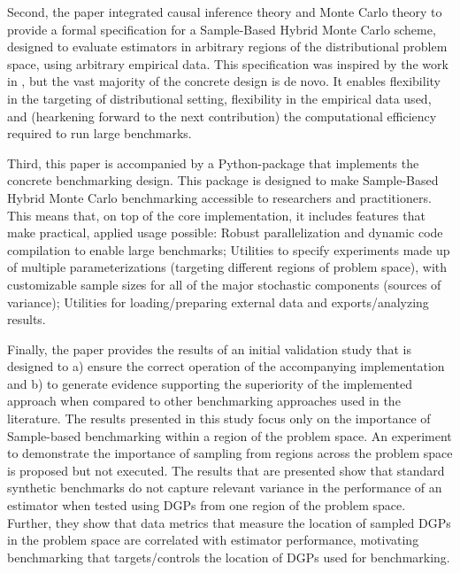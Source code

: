 \documentclass[../main.tex]{subfiles}
\begin{document}
\vspace{\baselineskip}

Second, the paper integrated causal inference theory and Monte Carlo theory to provide a formal specification for a Sample-Based Hybrid Monte Carlo scheme, designed to evaluate estimators in arbitrary regions of the distributional problem space, using arbitrary empirical data. This specification was inspired by the work in \textcite{Dorie2019Automated1}, but the vast majority of the concrete design is de novo. It enables flexibility in the targeting of distributional setting, flexibility in the empirical data used, and (hearkening forward to the next contribution) the computational efficiency required to run large benchmarks.

\vspace{\baselineskip}

Third, this paper is accompanied by a Python-package that implements the concrete benchmarking design. This package is designed to make Sample-Based Hybrid Monte Carlo benchmarking accessible to researchers and practitioners. This means that, on top of the core implementation, it includes features that make practical, applied usage possible: Robust parallelization and dynamic code compilation to enable large benchmarks; Utilities to specify experiments made up of multiple parameterizations (targeting different regions of problem space), with customizable sample sizes for all of the major stochastic components (sources of variance); Utilities for loading/preparing external data and exports/analyzing results.

\vspace{\baselineskip}

Finally, the paper provides the results of an initial validation study that is designed to a) ensure the correct operation of the accompanying implementation and b) to generate evidence supporting the superiority of the implemented approach when compared to other benchmarking approaches used in the literature. The results presented in this study focus only on the importance of Sample-based benchmarking within a region of the problem space. An experiment to demonstrate the importance of sampling from regions across the problem space is proposed but not executed. The results that are presented show that standard synthetic benchmarks do not capture relevant variance in the performance of an estimator when tested using DGPs from one region of the problem space. Further, they show that data metrics that measure the location of sampled DGPs in the problem space are correlated with estimator performance, motivating benchmarking that targets/controls the location of DGPs used for benchmarking.
\end{document}
